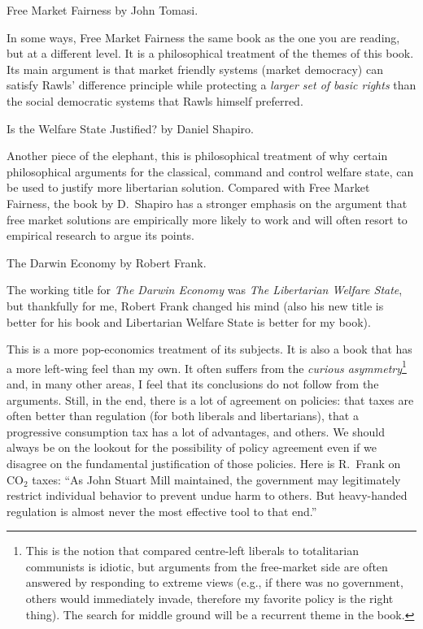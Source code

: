 \book Free Market Fairness by John Tomasi.

In some ways, Free Market Fairness the same book as the one you are reading,
but at a different level. It is a philosophical treatment of the themes of this
book. Its main argument is that market friendly systems (market democracy) can
satisfy Rawls' difference principle while protecting a \emph{larger set of
basic rights} than the social democratic systems that Rawls himself preferred.

\book Is the Welfare State Justified? by Daniel Shapiro.

Another piece of the elephant, this is philosophical treatment of why certain
philosophical arguments for the classical, command and control welfare state,
can be used to justify more libertarian solution. Compared with Free Market
Fairness, the book by D.\ Shapiro has a stronger emphasis on the argument that
free market solutions are empirically more likely to work and will often resort
to empirical research to argue its points.

\book The Darwin Economy by Robert Frank.

The working title for \emph{The Darwin Economy} was \emph{The Libertarian
Welfare State}, but thankfully for me, Robert Frank changed his mind (also his
new title is better for his book and Libertarian Welfare State is better for my
book).

This is a more pop-economics treatment of its subjects. It is also a book that
has a more left-wing feel than my own. It often suffers from the \emph{curious
asymmetry}\footnote{This is the notion that compared centre-left liberals to
totalitarian communists is idiotic, but arguments from the free-market side are
often answered by responding to extreme views (e.g., if there was no
government, others would immediately invade, therefore my favorite policy is
the right thing). The search for middle ground will be a recurrent theme in the
book.} and, in many other areas, I feel that its conclusions do not follow from
the arguments. Still, in the end, there is a lot of agreement on policies: that
taxes are often better than regulation (for both liberals and libertarians),
that a progressive consumption tax has a lot of advantages, and others. We
should always be on the lookout for the possibility of policy agreement even if
we disagree on the fundamental justification of those policies. Here is R.\ Frank
on CO$_2$ taxes: ``As John Stuart Mill maintained, the government may
legitimately restrict individual behavior to prevent undue harm to others. But
heavy-handed regulation is almost never the most effective tool to that end.''

